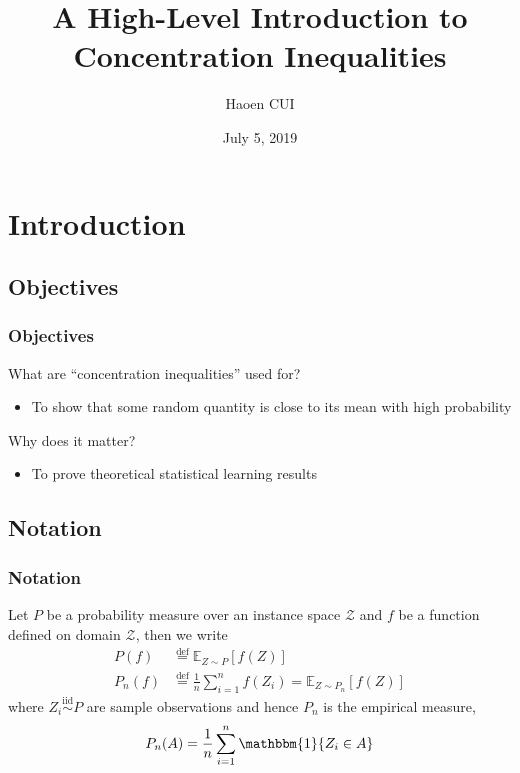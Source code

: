 \documentclass{beamer}
\title[Intro to Concentration Inequalities]{A High-Level Introduction to Concentration Inequalities} %
\author{Haoen CUI} %
\institute[Uptake] %
{
Uptake Math Club Lightning Talk
}
\date{July 5, 2019}
\begin{document}
\begin{frame}
\titlepage %
\end{frame}


\section{Introduction} 

\subsection{Objectives} 
\begin{frame}
\frametitle{Objectives} 

What are ``concentration inequalities'' used for? 
\begin{itemize}
    \item To show that some random quantity is close to its mean with high
probability
\end{itemize}

Why does it matter? 
\begin{itemize}
    \item To prove theoretical statistical learning results
\end{itemize}


\end{frame}


\subsection{Notation} 
\begin{frame}
\frametitle{Notation} 

Let $P$ be a probability measure over an instance space $\mathcal{Z}$ and $f$ be a function defined on domain $\mathcal{Z}$, then we write 
\begin{align*}
P(f)   &\stackrel{\text{def}}{=} \mathbb{E}_{Z \sim P}[f(Z)] \\ 
P_n(f) &\stackrel{\text{def}}{=} \frac{1}{n}\sum_{i=1}^{n} f(Z_i) = \mathbb{E}_{Z \sim P_n}[f(Z)]
\end{align*}
where $Z_i \stackrel{\text{iid}}{\sim} P$ are sample observations and hence $P_n$ is the empirical measure, 
$$ P_n(A) = \frac{1}{n} \sum_{i=1}^{n} \mathbbm{1}\{Z_i \in A\} $$

\end{frame}
\end{document}
